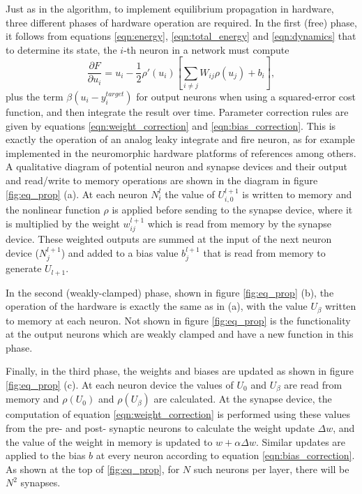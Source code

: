\documentclass[utf8]{frontiersSCNS}
\begin{document}
\begin{appendices}
Just as in the algorithm, to implement equilibrium propagation in hardware, three
different phases of hardware operation are required. In the first (free) phase, it follows
from equations \ref{eqn:energy}, \ref{eqn:total_energy} and \ref{eqn:dynamics} that to determine 
its state, the $i$-th neuron in a network must compute $$\frac{\partial F}{\partial 
u_i}=u_i-\frac{1}{2}\rho'(u_i)[\sum_{i\neq j}W_{ij}\rho(u_j)+b_i],$$ plus the term 
$\beta(u_i-y_i^{target})$ for output neurons when using a squared-error cost function, and then 
integrate the result over time. Parameter correction rules are given by equations 
\ref{eqn:weight_correction} and \ref{eqn:bias_correction}. This is exactly the 
operation of an analog leaky integrate and fire neuron, as for example implemented in the 
neuromorphic hardware platforms of references \citep{indiveri2011, schemmel2010} among others. A 
qualitative diagram of potential neuron and synapse devices and their output and read/write to 
memory operations are shown in the diagram in figure \ref{fig:eq_prop} (a). At each neuron $N^l_{i}$ 
the value of $U^{l+1}_{i,0}$ is written to memory and the nonlinear function $\rho$ is applied 
before sending to the synapse device, where it is multiplied by the weight $w^{l+1}_{ij}$ which is 
read from memory by the synapse device. These weighted outputs are summed at the input of the next 
neuron device ($N^{l+1}_j$) and added to a bias value $b^{l+1}_j$ that is read from memory to 
generate $U_{l+1}$.

In the second (weakly-clamped) phase, shown in figure \ref{fig:eq_prop} (b), the operation of the 
hardware is exactly the same as in (a), with the value $U_{\beta}$ written to memory at each 
neuron. Not shown in figure \ref{fig:eq_prop} is the functionality at the output neurons which are 
weakly clamped and have a new function in this phase.

Finally, in the third phase, the weights and biases are updated as shown in figure \ref{fig:eq_prop} (c). At each neuron device the values of $U_0$ and $U_\beta$ are read from memory and $\rho({U_0})$ and $\rho({U_\beta})$ are calculated. At the synapse device, the computation of equation \ref{eqn:weight_correction} is performed using these values from the pre- and post- synaptic neurons to calculate the weight update $\Delta w$, and the value of the weight in memory is updated to $w+\alpha\Delta w$.  Similar updates are applied to the bias $b$ at every neuron according to equation \ref{eqn:bias_correction}. As shown at the top of  \ref{fig:eq_prop}, for $N$ such neurons per layer, there will be $N^2$ synapses.


\end{appendices}
\end{document}
